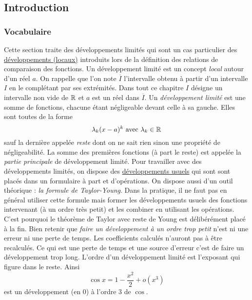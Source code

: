 

\subsection{Introduction}
\subsubsection{Vocabulaire}
Cette section traite des développements limités qui sont un cas particulier des \href{\baseurl C2064.pdf}{développements (locaux)} introduits lors de la définition des relations de comparaison des fonctions.\newline
Un développement limité est un concept \emph{local} autour d'un réel $a$. On rappelle que l'on note $\overline{I}$ l'intervalle obtenu à partir d'un intervalle $I$ en le complétant par ses extrémités. Dans tout ce chapitre $I$ désigne un intervalle non vide de $\mathbb{R}$ et $a$ est un réel dans $\overline{I}$.\newline
Un \emph{développement limité} est une somme de fonctions, chacune étant négligeable devant celle à sa gauche. Elles sont toutes de la forme
\begin{displaymath}
 \lambda_k (x-a)^k \text{ avec } \lambda_k\in\mathbb{R}
\end{displaymath}
sauf la dernière appelée \emph{reste} dont on ne sait rien sinon une propriété de négligeabilité. La somme des premières fonctions (à part le reste) est appelée la \emph{partie principale} de développement limité.\newline
Pour travailler avec des développements limités, on dispose des \href{\baseurl C5904.pdf}{développements usuels} qui sont sont placés dans un formulaire à part et d'opérations.\newline
On dispose aussi d'un outil théorique : \emph{la formule de Taylor-Young}. Dans la pratique, il ne faut pas en général utiliser cette formule mais former les développements usuels des fonctions intervenant (à un ordre très petit) et les combiner en utilisant les opérations. C'est pourquoi le théorème de Taylor avec reste de Young est délibérément placé à la fin.\newline
Bien retenir que \emph{faire un développement à un ordre trop petit} n'est ni une erreur ni une perte de temps. Les coefficients calculés n'auront pas à être recalculés. Ce qui est une perte de temps et une source d'erreur c'est de faire un développement trop long.
\newline
L'ordre d'un développement limité est l'exposant qui figure dans le reste. Ainsi
\begin{displaymath}
 \cos x = 1- \frac{x^2}{2}+o(x^3)
\end{displaymath}
est un développement (en $0$) à l'ordre $3$ de $\cos$.
